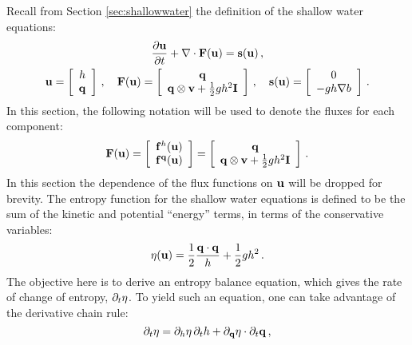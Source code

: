 Recall from Section \ref{sec:shallowwater} the definition of the shallow
water equations:
\begin{equation}
\begin{gathered}
  \ppt{\vectorsolution} + \nabla\cdot\consfluxvector
  = \conssource \eqc
\\
  \vectorsolution
    = \left[\begin{array}{c}\height\\\heightmomentum\end{array}\right]
  \eqc\quad
  \consfluxvector
  = \left[\begin{array}{c}\heightmomentum\\
    \heightmomentum\otimes\velocity + \half\gravity\height^2\identity
    \end{array}\right]
  \eqc\quad
  \conssource
  = \left[\begin{array}{c}0\\-\gravity\height\nabla\bathymetry\end{array}
    \right] \eqp
\end{gathered}
\end{equation}
In this section, the following notation will be used to denote the fluxes
for each component:
\[
  \consfluxvector
  = \left[\begin{array}{c}
    \mathbf{\consfluxletter}^\height(\vectorsolution)\\
    \mathbf{\consfluxletter}^\heightmomentum(\vectorsolution)
    \end{array}\right]
  = \left[\begin{array}{c}\heightmomentum\\
    \heightmomentum\otimes\velocity + \half\gravity\height^2\identity
    \end{array}\right] \eqp
\]
In this section the dependence of the flux functions on $\mathbf{u}$
will be dropped for brevity.
The entropy function for the shallow water equations is defined to be
the sum of the kinetic and potential ``energy'' terms, in terms of the
conservative variables:
\begin{equation}
  \eta(\mathbf{u}) = \frac{1}{2}\frac{\mathbf{q}\cdot\mathbf{q}}
  {h} + \frac{1}{2}gh^2
  \,.
\end{equation}
The objective here is to derive an entropy balance equation, which gives the
rate of change of entropy, $\partial_t\eta$. To yield such an
equation, one can take advantage of the derivative chain rule:
\begin{equation}\label{eq:shallowwater_chainrule}
  \partial_t\eta
  = \partial_h\eta\,\partial_th
  + \partial_{\mathbf{q}}\eta\cdot\partial_t\mathbf{q} \,,
\end{equation}
